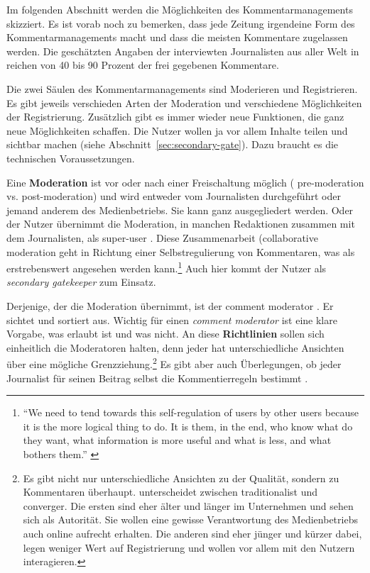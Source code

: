 Im folgenden Abschnitt werden die Möglichkeiten des Kommentarmanagements
skizziert. Es ist vorab noch zu bemerken, dass jede Zeitung irgendeine Form des
Kommentarmanagements macht und dass die meisten Kommentare zugelassen werden.
Die geschätzten Angaben der interviewten Journalisten aus aller Welt in
\textcite[S.~106]{singer} reichen von 40 bis 90 Prozent der frei gegebenen
Kommentare.

Die zwei Säulen des Kommentarmanagements sind Moderieren und Registrieren. Es
gibt jeweils verschieden Arten der Moderation und verschiedene Möglichkeiten der
Registrierung. Zusätzlich gibt es immer wieder neue Funktionen, die ganz neue
Möglichkeiten schaffen.  Die Nutzer wollen ja vor allem Inhalte teilen und
sichtbar machen (siehe Abschnitt~\ref{sec:secondary-gate}).
Dazu braucht es die technischen Voraussetzungen.

Eine {\bfseries Moderation} ist vor oder nach einer Freischaltung möglich (\glqq
pre-mo\-de\-ra\-tion\grqq{} vs. \glqq post-moderation\grqq) und wird entweder vom
Journalisten durchgeführt oder jemand anderem des Medienbetriebs. Sie kann ganz
ausgegliedert werden. Oder der Nutzer übernimmt die Moderation, in manchen
Redaktionen zusammen mit dem Journalisten, als \glqq super-user\grqq{}
\autocite[S.~112]{reich}. Diese Zusammenarbeit (\glqq collaborative
moderation\grqq{} \autocite[S.~109]{reich} geht in Richtung einer
Selbstregulierung von Kommentaren, was als erstrebenswert angesehen werden
kann.\footnote{``We need to tend towards this self-regulation of users by other
users because it is the more logical thing to do. It is them, in the end, who
know what do they want, what information is more useful and what is less, and
what bothers them.'' \autocite[S.~112]{reich}} Auch hier kommt der Nutzer als
\emph{secondary gatekeeper} zum Einsatz.

Derjenige, der die Moderation übernimmt, ist der \glqq comment moderator\grqq{}
\autocite[S.~68]{paulussen}. Er sichtet und sortiert aus. Wichtig für einen
{\slshape comment moderator} ist eine klare Vorgabe, was erlaubt ist und was
nicht. An diese {\bfseries Richtlinien} sollen sich einheitlich die Moderatoren
halten, denn jeder hat unterschiedliche Ansichten über eine mögliche
Grenzziehung.\footnote{Es gibt nicht nur unterschiedliche Ansichten zu der
Qualität, sondern zu Kommentaren überhaupt. \textcite{robinson} unterscheidet
zwischen \glqq traditionalist\grqq{} und \glqq converger\grqq{}. Die ersten
sind eher älter und länger im Unternehmen und sehen sich als Autorität. Sie
wollen eine gewisse Verantwortung des Medienbetriebs auch online aufrecht
erhalten. Die anderen sind eher jünger und kürzer dabei, legen weniger Wert
auf Registrierung und wollen vor allem mit den Nutzern interagieren.} Es gibt
aber auch Überlegungen, ob jeder Journalist für seinen Beitrag selbst die
Kommentierregeln bestimmt \autocite[S.~127]{singer}.


